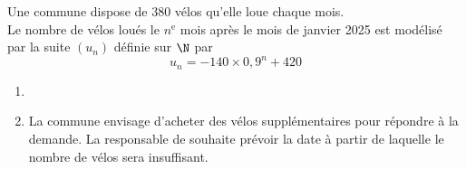 \documentclass[a4paper,11pt,exos]{nsi}
\begin{document}
\exo{}
Une commune dispose de 380 vélos qu'elle loue chaque mois.\\
Le nombre de vélos loués le $n^{\text{e}}$ mois après le mois de janvier 2025 est modélisé par la suite $(u_n)$ définie sur $\N$ par $$u_n = -140\times 0,9^n+420$$
\begin{enumerate}
    \item {}
    \item La commune envisage d'acheter des vélos supplémentaires pour répondre à la demande. La responsable de souhaite prévoir la date à partir de laquelle le nombre de vélos sera insuffisant.
\end{enumerate}

\newpage
\end{document}
